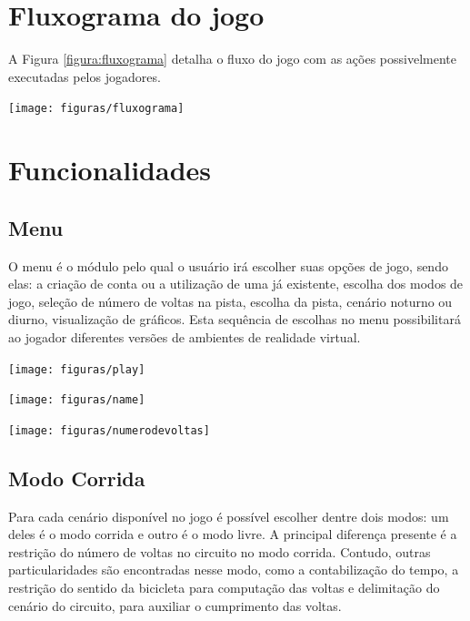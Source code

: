 \section{Fluxograma do jogo}

A Figura \ref{figura:fluxograma} detalha o fluxo do jogo com as ações possivelmente executadas pelos jogadores.

\begin{center}
	\texttt{[image: figuras/fluxograma]}
	\label{figura:fluxograma}
\end{center}

\section{Funcionalidades}
\subsection{Menu}
O menu é o módulo pelo qual o usuário irá escolher suas opções de jogo, sendo elas: a criação de conta ou a utilização de uma já existente, escolha dos modos de jogo, seleção de número de voltas na pista, escolha da pista, cenário noturno ou diurno, visualização de gráficos. Esta sequência de escolhas no menu possibilitará ao jogador diferentes versões de ambientes de realidade virtual.

\begin{center}
	\texttt{[image: figuras/play]}
	\label{figura:play}
\end{center}

\begin{center}
	\texttt{[image: figuras/name]}
	\label{figura:name}
\end{center}

\begin{center}
	\texttt{[image: figuras/numerodevoltas]}
	\label{figura:numVoltas}
\end{center}

\subsection{Modo Corrida}
\label{corrida}

Para cada cenário disponível no jogo é possível escolher dentre dois modos: um deles é o modo corrida e outro é o modo livre. A principal diferença presente é a restrição do número de voltas no circuito no modo corrida. Contudo, outras particularidades são encontradas nesse modo, como a contabilização do tempo, a restrição do sentido da bicicleta para computação das voltas e delimitação do cenário do circuito, para auxiliar o cumprimento das voltas.

